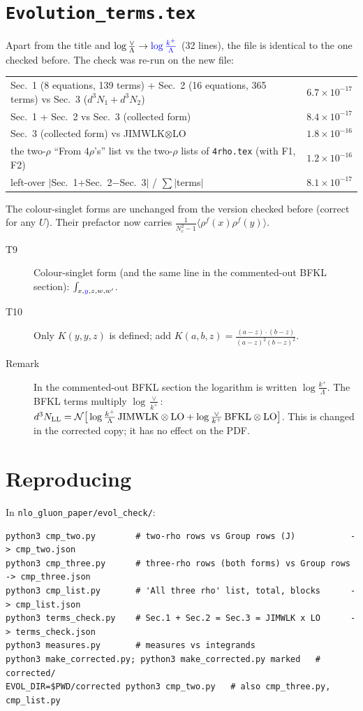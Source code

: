 \documentclass[10pt]{article}
\numberwithin{equation}{section}
\newcommand{\new}[1]{{\color{blue}#1}}
\begin{document}
\section{\texttt{Evolution\_terms.tex}}\label{sec:terms}
Apart from the title and $\log\frac{\vee}{\Lambda}\to\new{\log\frac{k^+}{\Lambda}}$ (32 lines), the file is identical to the one checked before. The check was re-run on the new file:
\begin{table}[H]\centering\small
\begin{tabular}{lc}
\toprule
Sec.~1 (8 equations, 139 terms) + Sec.~2 (16 equations, 365 terms) vs Sec.~3 ($d^3N_1+d^3N_2$) & $6.7\times10^{-17}$\\
Sec.~1 + Sec.~2 vs Sec.~3 (collected form) & $8.4\times10^{-17}$\\
Sec.~3 (collected form) vs JIMWLK$\otimes$LO & $1.8\times10^{-16}$\\
the two-$\rho$ ``From $4\rho$'s'' list vs the two-$\rho$ lists of \texttt{4rho.tex} (with F1, F2) & $1.2\times10^{-16}$\\
left-over $|$Sec.~1+Sec.~2$-$Sec.~3$|$ / $\sum|$terms$|$ & $8.1\times10^{-17}$\\
\bottomrule
\end{tabular}
\end{table}
\noindent The colour-singlet forms are unchanged from the version checked before (correct for any $U$). Their prefactor now carries $\frac{1}{N_c^2-1}\langle\rho^f(x)\rho^f(y)\rangle$.
\begin{description}
\item[T9] Colour-singlet form (and the same line in the commented-out BFKL section): $\int_{x,\new{y},z,w,w'}$.
\item[T10] Only $K(y,y,z)$ is defined; add $K(a,b,z)=\frac{(a-z)\cdot(b-z)}{(a-z)^2(b-z)^2}$.
\item[Remark] In the commented-out BFKL section the logarithm is written $\log\frac{k^+}{\Lambda}$. The BFKL terms multiply $\log\frac{\vee}{k^+}$: $d^3N_{\rm LL}=\mathcal N\big[\log\frac{k^+}{\Lambda}\,\text{JIMWLK}\otimes\text{LO}+\log\frac{\vee}{k^+}\,\text{BFKL}\otimes\text{LO}\big]$. This is changed in the corrected copy; it has no effect on the PDF.
\end{description}

\section{Reproducing}
In \texttt{nlo\_gluon\_paper/evol\_check/}:
\begin{verbatim}
python3 cmp_two.py        # two-rho rows vs Group rows (J)           -> cmp_two.json
python3 cmp_three.py      # three-rho rows (both forms) vs Group rows -> cmp_three.json
python3 cmp_list.py       # 'All three rho' list, total, blocks      -> cmp_list.json
python3 terms_check.py    # Sec.1 + Sec.2 = Sec.3 = JIMWLK x LO      -> terms_check.json
python3 measures.py       # measures vs integrands
python3 make_corrected.py; python3 make_corrected.py marked   # corrected/
EVOL_DIR=$PWD/corrected python3 cmp_two.py   # also cmp_three.py, cmp_list.py
\end{verbatim}
\end{document}
